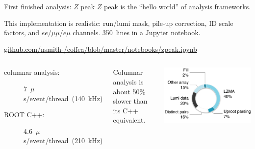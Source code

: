 \documentclass[aspectratio=169]{beamer}
\begin{document}
\begin{frame}{First finished analysis: $Z$ peak}
\vspace{0.5 cm}
$Z$ peak is the ``hello world'' of analysis frameworks.

\vspace{0.25 cm}
This implementation is realistic: run/lumi mask, pile-up correction, ID scale factors, and $ee$/$\mu\mu$/$e\mu$ channels. 350~lines in a Jupyter notebook.

\vspace{0.5 cm}
\textcolor{blue}{\small \url{github.com/nsmith-/coffea/blob/master/notebooks/zpeak.ipynb}}

\vspace{0.5 cm}
\begin{columns}[b]
\large
\begin{description}
\item[columnar analysis:] \hfill \mbox{\hspace{-1 cm}7~$\mu$s/event/thread (140~kHz)}
\item[ROOT C++:] \hfill \mbox{\hspace{-1 cm}4.6~$\mu$s/event/thread (210~kHz)}
\end{description}

\vspace{0.25 cm}
Columnar analysis is about 50\% slower than its C++ equivalent.

\includegraphics[width=\linewidth]{zpeak-performance-breakdown.png}
\end{columns}
\end{frame}
\end{document}
